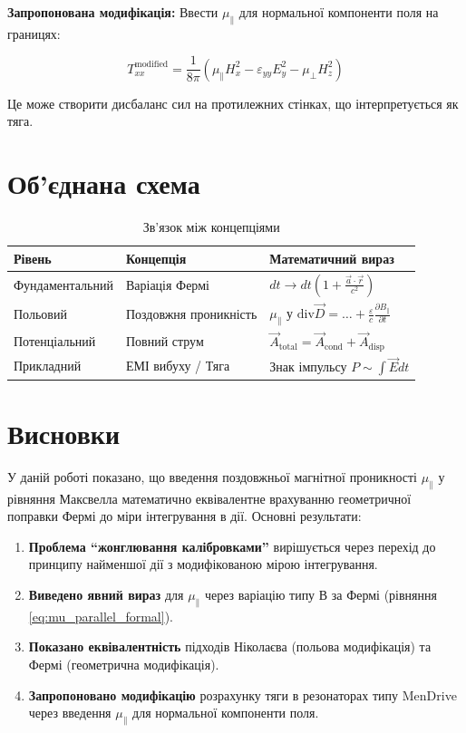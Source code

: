\documentclass[12pt, a4paper]{article}
\begin{document}
\textbf{Запропонована модифікація:} Ввести $\mu_{\parallel}$ для нормальної компоненти поля на границях:

\begin{equation}
T_{xx}^{\text{modified}} = \frac{1}{8\pi} \left( \mu_{\parallel} H_x^2 - \varepsilon_{yy} E_y^2 - \mu_{\perp} H_z^2 \right)
\label{eq:stress_tensor_modified}
\end{equation}

Це може створити дисбаланс сил на протилежних стінках, що інтерпретується як тяга.

\section{Об'єднана схема}

\begin{table}[h]
\centering
\caption{Зв'язок між концепціями}
\begin{tabular}{|l|l|l|}
\hline
\textbf{Рівень} & \textbf{Концепція} & \textbf{Математичний вираз} \\
\hline
Фундаментальний & Варіація Фермі & $dt \to dt(1 + \frac{\vec{a}\cdot\vec{r}}{c^2})$ \\
\hline
Польовий & Поздовжня проникність & $\mu_{\parallel}$ у $\text{div}\vec{D} = \dots + \frac{\varepsilon}{c}\frac{\partial B_{\parallel}}{\partial t}$ \\
\hline
Потенціальний & Повний струм & $\vec{A}_{\text{total}} = \vec{A}_{\text{cond}} + \vec{A}_{\text{disp}}$ \\
\hline
Прикладний & ЕМІ вибуху / Тяга & Знак імпульсу $P \sim \int \vec{E} dt$ \\
\hline
\end{tabular}
\label{tab:unified}
\end{table}

\section{Висновки}

У даній роботі показано, що введення поздовжньої магнітної проникності $\mu_{\parallel}$ у рівняння Максвелла математично еквівалентне врахуванню геометричної поправки Фермі до міри інтегрування в дії. Основні результати:

\begin{enumerate}
    \item \textbf{Проблема ``жонглювання калібровками''} вирішується через перехід до принципу найменшої дії з модифікованою мірою інтегрування.

    \item \textbf{Виведено явний вираз} для $\mu_{\parallel}$ через варіацію типу В за Фермі (рівняння \ref{eq:mu_parallel_formal}).

    \item \textbf{Показано еквівалентність} підходів Ніколаєва (польова модифікація) та Фермі (геометрична модифікація).

    \item \textbf{Запропоновано модифікацію} розрахунку тяги в резонаторах типу MenDrive через введення $\mu_{\parallel}$ для нормальної компоненти поля.
\end{enumerate}
\end{document}
